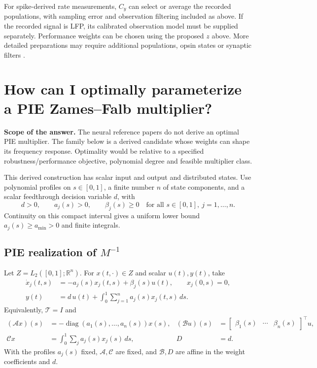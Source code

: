 ﻿\documentclass[11pt,a4paper]{article}
\begin{document}
For spike-derived rate measurements, $C_y$ can select or average the
recorded populations, with sampling error and observation filtering
included as above. If the recorded signal is LFP, its calibrated
observation model must be supplied separately. Performance weights can
be chosen using the proposed $z$ above. More detailed preparations may
require additional populations, opsin states or synaptic filters
\cite{grosenick2015,lindi2024,ortone2023}.

\bigskip
\begingroup
\small
\setlength{\parskip}{0.25em}
\setlength{\abovedisplayskip}{5pt}
\setlength{\belowdisplayskip}{5pt}
\section*{How can I optimally parameterize a PIE Zames--Falb multiplier?}

\textbf{Scope of the answer.} The neural reference papers do not derive
an optimal PIE multiplier. The family below is a derived candidate
whose weights can shape its frequency response. Optimality would be
relative to a specified robustness/performance objective, polynomial
degree and feasible multiplier class.

This derived construction has scalar input and output and distributed
states. Use polynomial profiles on $s\in[0,1]$, a finite number $n$ of
state components, and a scalar feedthrough decision variable $d$, with
\begin{equation*}
\boxed{d>0,\qquad a_j(s)>0,\qquad\beta_j(s)\geq0
\quad\text{for all }s\in[0,1],\ j=1,\ldots,n.}
\end{equation*}
Continuity on this compact interval gives a uniform lower bound
$a_j(s)\geq a_{\min}>0$ and finite integrals.

\subsection*{PIE realization of $M^{-1}$}
Let $Z=L_2([0,1];\mathbb R^n)$. For $x(t,\cdot)\in Z$ and scalar
$u(t),y(t)$, take
\begin{equation*}
\begin{aligned}
\dot x_j(t,s)&=-a_j(s)x_j(t,s)+\beta_j(s)u(t),\qquad x_j(0,s)=0,\\
y(t)&=d\,u(t)+\int_0^1\sum_{j=1}^n a_j(s)x_j(t,s)\,ds.
\end{aligned}
\end{equation*}
Equivalently, $\mathcal T=I$ and
\begin{equation*}
\begin{aligned}
(\mathcal Ax)(s)&=-\operatorname{diag}(a_1(s),\ldots,a_n(s))x(s),&
(\mathcal Bu)(s)&=\begin{bmatrix}\beta_1(s)&\cdots&\beta_n(s)\end{bmatrix}^{\!\top}u,\\
\mathcal Cx&=\int_0^1\sum_j a_j(s)x_j(s)\,ds,& D&=d.
\end{aligned}
\end{equation*}
With the profiles $a_j(s)$ fixed, $\mathcal A,\mathcal C$ are fixed,
and $\mathcal B,D$ are affine in the weight coefficients and $d$.
\end{document}
